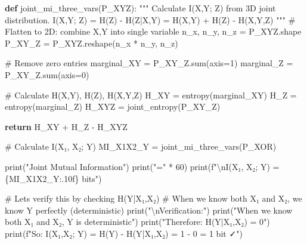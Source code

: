 \documentclass[
  11pt,
  letterpaper,
  oneside,
  openany]{book}
\newenvironment{Shaded}{\begin{snugshade}}{\end{snugshade}}
\newcommand{\BuiltInTok}[1]{\textcolor[rgb]{0.00,0.23,0.31}{#1}}
\newcommand{\CharTok}[1]{\textcolor[rgb]{0.13,0.47,0.30}{#1}}
\newcommand{\CommentTok}[1]{\textcolor[rgb]{0.37,0.37,0.37}{#1}}
\newcommand{\ControlFlowTok}[1]{\textcolor[rgb]{0.00,0.23,0.31}{\textbf{#1}}}
\newcommand{\DecValTok}[1]{\textcolor[rgb]{0.68,0.00,0.00}{#1}}
\newcommand{\KeywordTok}[1]{\textcolor[rgb]{0.00,0.23,0.31}{\textbf{#1}}}
\newcommand{\NormalTok}[1]{\textcolor[rgb]{0.00,0.23,0.31}{#1}}
\newcommand{\OperatorTok}[1]{\textcolor[rgb]{0.37,0.37,0.37}{#1}}
\newcommand{\SpecialCharTok}[1]{\textcolor[rgb]{0.37,0.37,0.37}{#1}}
\newcommand{\SpecialStringTok}[1]{\textcolor[rgb]{0.13,0.47,0.30}{#1}}
\newcommand{\StringTok}[1]{\textcolor[rgb]{0.13,0.47,0.30}{#1}}
\begin{document}
\begin{Shaded}
\begin{Highlighting}[]
\KeywordTok{def}\NormalTok{ joint\_mi\_three\_vars(P\_XYZ):}
    \CommentTok{"""}
\CommentTok{    Calculate I(X,Y; Z) from 3D joint distribution.}
\CommentTok{    }
\CommentTok{    I(X,Y; Z) = H(Z) {-} H(Z|X,Y)}
\CommentTok{              = H(X,Y) + H(Z) {-} H(X,Y,Z)}
\CommentTok{    """}
    \CommentTok{\# Flatten to 2D: combine X,Y into single variable}
\NormalTok{    n\_x, n\_y, n\_z }\OperatorTok{=}\NormalTok{ P\_XYZ.shape}
\NormalTok{    P\_XY\_Z }\OperatorTok{=}\NormalTok{ P\_XYZ.reshape(n\_x }\OperatorTok{*}\NormalTok{ n\_y, n\_z)}
    
    \CommentTok{\# Remove zero entries}
\NormalTok{    marginal\_XY }\OperatorTok{=}\NormalTok{ P\_XY\_Z.}\BuiltInTok{sum}\NormalTok{(axis}\OperatorTok{=}\DecValTok{1}\NormalTok{)}
\NormalTok{    marginal\_Z }\OperatorTok{=}\NormalTok{ P\_XY\_Z.}\BuiltInTok{sum}\NormalTok{(axis}\OperatorTok{=}\DecValTok{0}\NormalTok{)}
    
    \CommentTok{\# Calculate H(X,Y), H(Z), H(X,Y,Z)}
\NormalTok{    H\_XY }\OperatorTok{=}\NormalTok{ entropy(marginal\_XY)}
\NormalTok{    H\_Z }\OperatorTok{=}\NormalTok{ entropy(marginal\_Z)}
\NormalTok{    H\_XYZ }\OperatorTok{=}\NormalTok{ joint\_entropy(P\_XY\_Z)}
    
    \ControlFlowTok{return}\NormalTok{ H\_XY }\OperatorTok{+}\NormalTok{ H\_Z }\OperatorTok{{-}}\NormalTok{ H\_XYZ}

\CommentTok{\# Calculate I(X₁, X₂; Y)}
\NormalTok{MI\_X1X2\_Y }\OperatorTok{=}\NormalTok{ joint\_mi\_three\_vars(P\_XOR)}

\BuiltInTok{print}\NormalTok{(}\StringTok{"Joint Mutual Information"}\NormalTok{)}
\BuiltInTok{print}\NormalTok{(}\StringTok{"="} \OperatorTok{*} \DecValTok{60}\NormalTok{)}
\BuiltInTok{print}\NormalTok{(}\SpecialStringTok{f"}\CharTok{\textbackslash{}n}\SpecialStringTok{I(X₁, X₂; Y) = }\SpecialCharTok{\{}\NormalTok{MI\_X1X2\_Y}\SpecialCharTok{:.10f\}}\SpecialStringTok{ bits"}\NormalTok{)}

\CommentTok{\# Let\textquotesingle{}s verify this by checking H(Y|X₁,X₂)}
\CommentTok{\# When we know both X₁ and X₂, we know Y perfectly (deterministic)}
\BuiltInTok{print}\NormalTok{(}\StringTok{"}\CharTok{\textbackslash{}n}\StringTok{Verification:"}\NormalTok{)}
\BuiltInTok{print}\NormalTok{(}\StringTok{"When we know both X₁ and X₂, Y is deterministic"}\NormalTok{)}
\BuiltInTok{print}\NormalTok{(}\StringTok{"Therefore: H(Y|X₁,X₂) = 0"}\NormalTok{)}
\BuiltInTok{print}\NormalTok{(}\SpecialStringTok{f"So: I(X₁,X₂; Y) = H(Y) {-} H(Y|X₁,X₂) = 1 {-} 0 = 1 bit ✓"}\NormalTok{)}


\end{Highlighting}
\end{Shaded}
\end{document}

